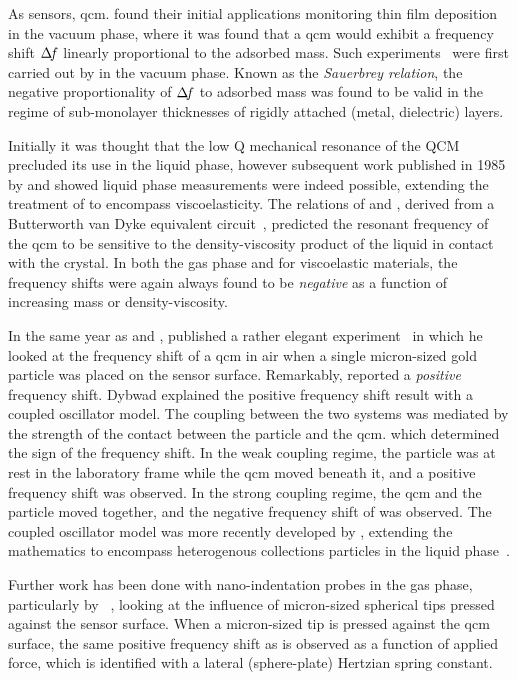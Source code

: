 As sensors, \gls{qcm}. found their initial applications monitoring thin film
deposition in the vacuum phase, where it was found that a \gls{qcm} would exhibit
a frequency shift $\Delta\!f$ linearly proportional to the adsorbed mass.  Such
experiments~\cite{sauerbrey1959verwendung} were first carried out by
 in the vacuum phase.  Known as the \textit{Sauerbrey
relation}, the negative proportionality of $\Delta\!f$ to adsorbed mass was found
to be valid in the regime of sub-monolayer thicknesses of rigidly attached
(metal, dielectric) layers.

Initially it was thought that the low Q mechanical resonance of the QCM
precluded its use in the liquid phase, however subsequent work published in
1985 by  and  showed liquid phase measurements
were indeed possible, extending the treatment of  to
encompass viscoelasticity.  The relations of  and
, derived from a Butterworth van Dyke equivalent
circuit~\cite{kanazawa1985frequency}, predicted the resonant frequency of
the \gls{qcm} to be sensitive to the density-viscosity product of the liquid in
contact with the crystal.  In both the gas phase and for viscoelastic
materials, the frequency shifts were again always found to be
\textit{negative} as a function of increasing mass or density-viscosity.

In the same year as  and , 
published a rather elegant experiment~\cite{dybwad1985sensitive} in which
he looked at the frequency shift of a \gls{qcm} in air when a single micron-sized
gold particle was placed on the sensor surface.  Remarkably, 
reported a \textit{positive} frequency shift.  Dybwad explained the
positive frequency shift result with a coupled oscillator model.  The
coupling between the two systems was mediated by the strength of the
contact between the particle and the \gls{qcm}. which determined the sign of the
frequency shift.  In the weak coupling regime, the particle was at rest in
the laboratory frame while the \gls{qcm} moved beneath it, and a positive
frequency shift was observed.  In the strong coupling regime, the \gls{qcm} and
the particle moved together, and the negative frequency shift of
 was observed.  The coupled oscillator model was more
recently developed by , extending the mathematics to
encompass heterogenous collections particles in the liquid
phase~\cite{johannsman2007contacts}.

Further work has been done with nano-indentation probes in the gas phase,
particularly by ~\cite{borovsky2001measuring}, looking at
the influence of micron-sized spherical tips pressed against the sensor
surface.  When a micron-sized tip is pressed against the \gls{qcm} surface, the
same positive frequency shift as  is observed as a function of
applied force, which is identified with a lateral (sphere-plate) Hertzian
spring constant.

